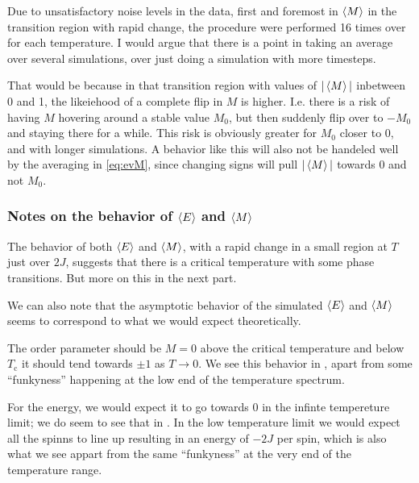 \documentclass[11pt,letter, swedish, english
]{article}
\newcommand{\Tc}{\ensuremath{T_{\text{c}}}}
\begin{document}
Due to unsatisfactory noise levels in the data, first and foremost in
$\ev{M}$ in the transition region with rapid change, the procedure
were performed 16 times over for each temperature. I would argue that
there is a point in taking an average over several simulations, over
just doing a simulation with more timesteps. 

That would be because in that transition region with values of
$|\ev{M}|$ inbetween 0 and 1, the likeiehood of a complete flip in $M$
is higher. I.e. there is a risk of having $M$ hovering around a stable
value $M_0$, but then suddenly flip over to $-M_0$ and staying there
for a while. This risk is obviously greater for $M_0$ closer to $0$,
and with longer simulations. A behavior like this will also not be
handeled well by the averaging in \eqref{eq:evM}, since changing signs
will pull $|\ev{M}|$ towards 0 and not $M_0$.



\subsubsection{Notes on the behavior of $\ev{E}$ and $\ev{M}$}
The behavior of both $\ev{E}$ and $\ev{M}$, with a rapid change in a
small region at $T$ just over $2J$, suggests that there is a critical
temperature with some phase transitions. But more on this in the next
part. 

We can also note that the asymptotic behavior of the simulated
$\ev{E}$ and $\ev{M}$ seems to correspond to what we would expect
theoretically. 

The order parameter should be $M=0$ above the critical
temperature and below $\Tc$ it should tend towards $\pm1$ as
$T\to0$. We see this behavior in , apart from some
``funkyness'' happening at the low end of the temperature spectrum. 

For the energy, we would expect it to go towards 0 in the infinte
tempereture limit; we do seem to see that in . In the
low temperature limit we would expect all the spinns to line up
resulting in an energy of $-2J$ per spin\footnotemark{}, which is also
what we see appart from the same ``funkyness'' at the very end of the
temperature range. 
\end{document}
